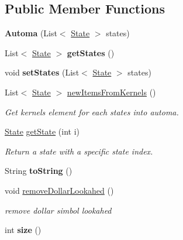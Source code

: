 \subsection*{Public Member Functions}
\begin{DoxyCompactItemize}
\item 
\hypertarget{classcontext_free_1_1parser_1_1_automa_a6a030d3a01bf7ef99b437fcf14727bad}{{\bfseries Automa} (List$<$ \hyperlink{classcontext_free_1_1parser_1_1_state}{State} $>$ states)}\label{classcontext_free_1_1parser_1_1_automa_a6a030d3a01bf7ef99b437fcf14727bad}

\item 
\hypertarget{classcontext_free_1_1parser_1_1_automa_a0a2be97fe40e3035c579b83535649c2e}{List$<$ \hyperlink{classcontext_free_1_1parser_1_1_state}{State} $>$ {\bfseries get\-States} ()}\label{classcontext_free_1_1parser_1_1_automa_a0a2be97fe40e3035c579b83535649c2e}

\item 
\hypertarget{classcontext_free_1_1parser_1_1_automa_a16f74867e919ccddf13441295c80295b}{void {\bfseries set\-States} (List$<$ \hyperlink{classcontext_free_1_1parser_1_1_state}{State} $>$ states)}\label{classcontext_free_1_1parser_1_1_automa_a16f74867e919ccddf13441295c80295b}

\item 
List$<$ \hyperlink{classcontext_free_1_1parser_1_1_state}{State} $>$ \hyperlink{classcontext_free_1_1parser_1_1_automa_ad82cfb3bb6b22d084ef18a95350828b3}{new\-Items\-From\-Kernels} ()
\begin{DoxyCompactList}\small\item\em Get kernels element for each states into automa. \end{DoxyCompactList}\item 
\hyperlink{classcontext_free_1_1parser_1_1_state}{State} \hyperlink{classcontext_free_1_1parser_1_1_automa_a08b46ef04492599b98660a5e55f356bd}{get\-State} (int i)
\begin{DoxyCompactList}\small\item\em Return a state with a specific state index. \end{DoxyCompactList}\item 
\hypertarget{classcontext_free_1_1parser_1_1_automa_a816d25575a45d9a0bbc415a6e0a71a2e}{String {\bfseries to\-String} ()}\label{classcontext_free_1_1parser_1_1_automa_a816d25575a45d9a0bbc415a6e0a71a2e}

\item 
void \hyperlink{classcontext_free_1_1parser_1_1_automa_ad94ecd3a9f8850220f86b6c54b751f78}{remove\-Dollar\-Lookahed} ()
\begin{DoxyCompactList}\small\item\em remove dollar simbol lookahed \end{DoxyCompactList}\item 
\hypertarget{classcontext_free_1_1parser_1_1_automa_aa3e53614ea757f72b87144aa6b5b2282}{int {\bfseries size} ()}\label{classcontext_free_1_1parser_1_1_automa_aa3e53614ea757f72b87144aa6b5b2282}

\end{DoxyCompactItemize}
